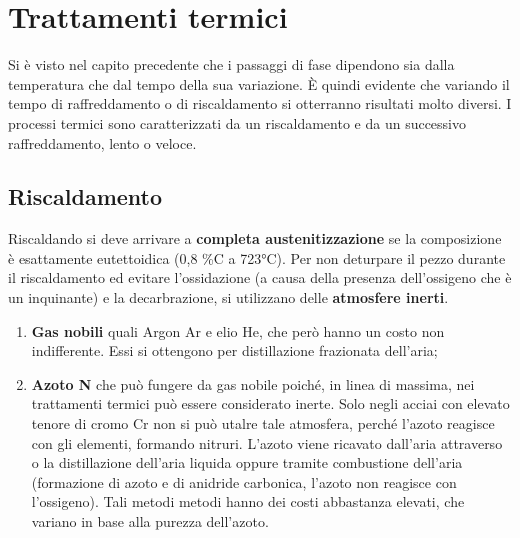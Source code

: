 \setchapterpreamble[u]{\margintoc}
\chapter{Trattamenti termici}

Si è visto nel capito precedente che i passaggi di fase dipendono sia dalla temperatura che dal tempo della sua variazione. È quindi evidente che variando il tempo di raffreddamento o di riscaldamento si otterranno risultati molto diversi. I processi termici sono caratterizzati da un riscaldamento e da un successivo raffreddamento, lento o veloce.

\section{Riscaldamento}

Riscaldando si deve arrivare a \textbf{completa austenitizzazione} se la composizione è esattamente eutettoidica (0,8 \%C a 723°C).
Per non deturpare il pezzo durante il riscaldamento ed evitare l’ossidazione (a causa della presenza dell’ossigeno che è un inquinante) e la decarbrazione, si utilizzano delle \textbf{atmosfere inerti}.
\begin{enumerate}
    \item \textbf{Gas nobili} quali Argon Ar e elio He, che però hanno un costo non indifferente. Essi si ottengono per distillazione frazionata dell’aria;
    \item \textbf{Azoto N}  che può fungere da gas nobile poiché, in linea di massima, nei trattamenti termici può essere considerato inerte. Solo negli acciai con elevato tenore di cromo Cr non si può utalre tale atmosfera, perché l’azoto reagisce con gli elementi, formando nitruri. L’azoto viene ricavato dall’aria attraverso o la distillazione dell’aria liquida oppure tramite combustione dell’aria (formazione di azoto e di anidride carbonica, l’azoto non reagisce con l’ossigeno). Tali metodi metodi hanno dei costi abbastanza elevati, che variano in base alla purezza dell’azoto.
\end{enumerate}

